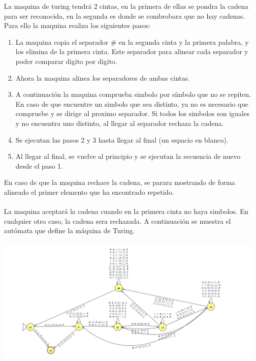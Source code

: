 \documentclass[11pt, a4paper]{exam}
\begin{document}
\begin{questions}
\begin{parts}
\begin{solution}
            La maquina de turing tendrá 2 cintas, en la primera de ellas se pondra la cadena para ser reconocida, en la segunda es donde se combrobara que no hay cadenas. Para ello la maquina realiza los siguientes pasos:
            \begin{enumerate}
                \item La maquina copia el separador $\#$ en la segunda cinta y la primera palabra, y los elimina de la primera cinta. Este separador para alinear cada separador y poder comparar digito por digito.
                \item Ahora la maquina alinea los separadores de ambas cintas.
                \item A continuación la maquina comprueba simbolo por símbolo que no se repiten. En caso de que encuentre un simbolo que sea distinto, ya no es necesario que compruebe y se dirige al proximo separador. Si todos los simbolos son iguales y no encuentra uno distinto, al llegar al separador rechaza la cadena.
                \item Se ejecutan las pasos 2 y 3 hasta llegar al final (un espacio en blanco).
                \item Al llegar al final, se vuelve al principio y se ejecutan la secuencia de nuevo desde el paso 1.
            \end{enumerate}
            En caso de que la maquina rechace la cadena, se parara mostrando de forma alineado el primer elemento que ha encontrado repetido.
            \\
            \\
            La maquina aceptará la cadena cuando en la primera cinta no haya simbolos. En cualquier otro caso, la cadena sera rechazada.
            A continuación se muestra el autómata que define la máquina de Turing. 
            \\
            \\
            \includegraphics[width = 16 cm]{figs/M4Multicinta.png}

\end{solution}
\end{parts}
\end{questions}
\end{document}
